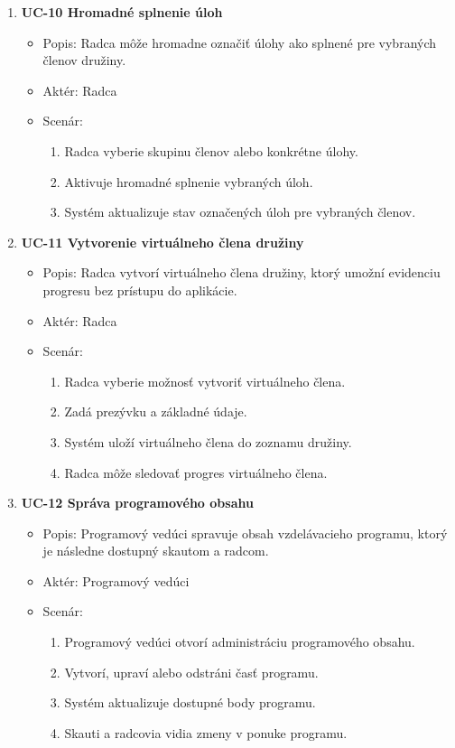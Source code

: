 \begin{enumerate}
    \item \textbf{UC-10 Hromadné splnenie úloh}
    \begin{itemize}
        \item Popis: Radca môže hromadne označiť úlohy ako splnené pre vybraných členov družiny.
        \item Aktér: Radca
        \item Scenár:
        \begin{enumerate}
            \item Radca vyberie skupinu členov alebo konkrétne úlohy.
            \item Aktivuje hromadné splnenie vybraných úloh.
            \item Systém aktualizuje stav označených úloh pre vybraných členov.
        \end{enumerate}
    \end{itemize}

    \item \textbf{UC-11 Vytvorenie virtuálneho člena družiny}
    \begin{itemize}
        \item Popis: Radca vytvorí virtuálneho člena družiny, ktorý umožní evidenciu progresu bez prístupu do aplikácie.
        \item Aktér: Radca
        \item Scenár:
        \begin{enumerate}
            \item Radca vyberie možnosť vytvoriť virtuálneho člena.
            \item Zadá prezývku a základné údaje.
            \item Systém uloží virtuálneho člena do zoznamu družiny.
            \item Radca môže sledovať progres virtuálneho člena.
        \end{enumerate}
    \end{itemize}

    \item \textbf{UC-12 Správa programového obsahu}
    \begin{itemize}
        \item Popis: Programový vedúci spravuje obsah vzdelávacieho programu, ktorý je následne dostupný skautom a radcom.
        \item Aktér: Programový vedúci
        \item Scenár:
        \begin{enumerate}
            \item Programový vedúci otvorí administráciu programového obsahu.
            \item Vytvorí, upraví alebo odstráni časť programu.
            \item Systém aktualizuje dostupné body programu.
            \item Skauti a radcovia vidia zmeny v ponuke programu.
        \end{enumerate}
    \end{itemize}
\end{enumerate}

